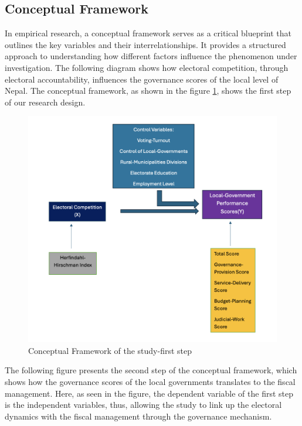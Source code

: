 \subsection{Conceptual Framework}
In empirical research, a conceptual framework serves as a critical blueprint that outlines the key variables and their interrelationships. It provides a structured approach to understanding how different factors influence the phenomenon under investigation. The following diagram shows how electoral competition, through electoral accountability, influences the governance scores of the local level of Nepal. The conceptual framework, as shown in the figure \ref{Conceptual Framework step 1}, shows the first step of our research design.
\newpage
\begin{figure}[h]
\centering
\hspace{-1cm}
\includegraphics[width = 160mm, scale = 0.35]{figure/Conframe1.png}
\caption{Conceptual Framework of the study-first step}
\label{Conceptual Framework step 1}
\end{figure}
The following figure presents the second step of the conceptual framework, which shows how the governance scores of the local governments translates to the fiscal management. Here, as seen in the figure, the dependent variable of the first step is the independent variables, thus, allowing the study to link up the electoral dynamics with the fiscal management through the governance mechanism.
